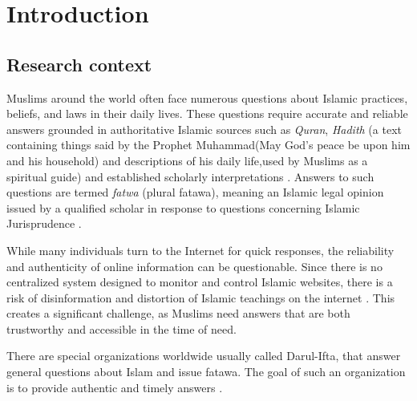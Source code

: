 
\chapter{Introduction}
\label{chap:intro}
\section{Research context}
\label{sec:section}

Muslims around the world often face numerous questions about Islamic practices, beliefs, and laws in their daily lives. These questions require accurate and reliable answers grounded in authoritative Islamic sources such as \textit{Quran}, \textit{Hadith} (a text containing things said by the Prophet Muhammad(May God's peace be upon him and his household) and descriptions of his daily life,used by Muslims as a spiritual guide) \cite{oxford-hadith} and established scholarly interpretations \cite{alghazali}.  Answers to such questions are termed \textit{fatwa} (plural fatawa), meaning an Islamic legal opinion issued by a qualified scholar in response to questions concerning Islamic Jurisprudence \cite{skovgaard1997defining}.
 
While many individuals turn to the Internet for quick responses, the reliability and authenticity of online information can be questionable. Since there is no centralized system designed to monitor and control Islamic websites, there is a risk of disinformation and distortion of Islamic teachings on the internet \cite{wan2015information}. This creates a significant challenge, as Muslims need answers that are both trustworthy and accessible in the time of need.

There are special organizations worldwide usually called Darul-Ifta, that answer general questions about Islam and issue fatawa.
The goal of such an organization is to provide authentic and timely answers \cite{coughlin1999encyclopedia}.

